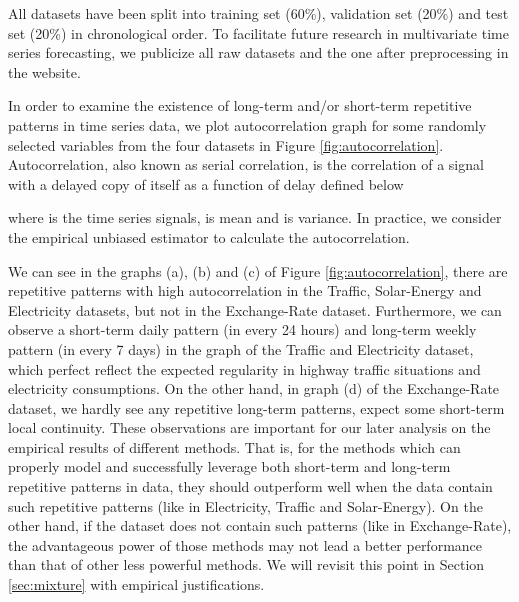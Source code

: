 \documentclass[sigconf]{acmart}
\def\electricity{{\sf Electricity}\xspace}
\def\traffic{{\sf Traffic}\xspace}
\def\solar{{\sf Solar-Energy}\xspace}
\def\exchange{{\sf Exchange-Rate}\xspace}
\begin{document}
All datasets have been split into training set (60\%), validation set (20\%) and test set (20\%) in chronological order. To facilitate future research in multivariate time series forecasting, we publicize all raw datasets and the one after preprocessing in the website.




In order to examine the existence of long-term and/or short-term repetitive patterns in time series data, we plot autocorrelation graph for some randomly selected variables from the four datasets in Figure \ref{fig:autocorrelation}. Autocorrelation, also known as serial correlation, is the correlation of a signal with a delayed copy of itself as a function of delay defined below

where  is the time series signals,  is mean and  is variance. In practice, we consider the empirical unbiased estimator to calculate the autocorrelation.  

We can see in the graphs (a), (b) and (c) of Figure \ref{fig:autocorrelation}, there are repetitive patterns with high autocorrelation in the \traffic, \solar and \electricity datasets, but not in the \exchange dataset. Furthermore, we can observe a short-term daily pattern (in every 24 hours) and long-term weekly pattern (in every 7 days) in the graph of the \traffic and \electricity dataset, which perfect reflect the expected regularity in highway traffic situations and electricity consumptions.  On the other hand, in graph (d) of the \exchange dataset, we hardly see any repetitive long-term patterns, expect some short-term local continuity. These observations are important for our later analysis on the empirical results of different methods.  That is, for the methods which can properly model and successfully leverage both short-term and long-term repetitive patterns in data, they should outperform well when the data contain such repetitive patterns (like in \electricity, \traffic and \solar).  On the other hand, if the dataset does not contain such patterns (like in \exchange), the advantageous power of those methods may not lead a better performance than that of other less powerful methods.  We will revisit this point in Section \ref{sec:mixture} with empirical justifications.
\end{document}
